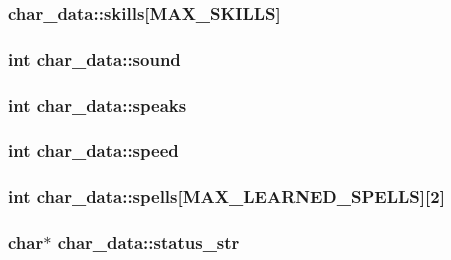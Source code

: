 \hypertarget{structchar__data_a4df8d97fcd32b649d3072e6fe668d0ce}{
\subsubsection[{skills}]{ char\-\_\-data\-::skills\mbox{[}{\bf M\-A\-X\-\_\-\-S\-K\-I\-L\-L\-S}\mbox{]}}}\label{structchar__data_a4df8d97fcd32b649d3072e6fe668d0ce}
\hypertarget{structchar__data_a4611feb8cd35aaf30e03e931001f0473}{
\subsubsection[{sound}]{\setlength{\rightskip}{0pt plus 5cm}int char\-\_\-data\-::sound}}\label{structchar__data_a4611feb8cd35aaf30e03e931001f0473}
\hypertarget{structchar__data_af1c2d26314e124d4120cc0cfa43e6ace}{
\subsubsection[{speaks}]{\setlength{\rightskip}{0pt plus 5cm}int char\-\_\-data\-::speaks}}\label{structchar__data_af1c2d26314e124d4120cc0cfa43e6ace}
\hypertarget{structchar__data_ac7f93b59cc34806a603bed866dc3b640}{
\subsubsection[{speed}]{\setlength{\rightskip}{0pt plus 5cm}int char\-\_\-data\-::speed}}\label{structchar__data_ac7f93b59cc34806a603bed866dc3b640}
\hypertarget{structchar__data_ac09a999c27b701b68ce0cf5184280628}{
\subsubsection[{spells}]{\setlength{\rightskip}{0pt plus 5cm}int char\-\_\-data\-::spells\mbox{[}{\bf M\-A\-X\-\_\-\-L\-E\-A\-R\-N\-E\-D\-\_\-\-S\-P\-E\-L\-L\-S}\mbox{]}\mbox{[}2\mbox{]}}}\label{structchar__data_ac09a999c27b701b68ce0cf5184280628}
\hypertarget{structchar__data_ab82112b1f66683c7cb9e4b179f130024}{
\subsubsection[{status\-\_\-str}]{\setlength{\rightskip}{0pt plus 5cm}char$\ast$ char\-\_\-data\-::status\-\_\-str}}\label{structchar__data_ab82112b1f66683c7cb9e4b179f130024}
